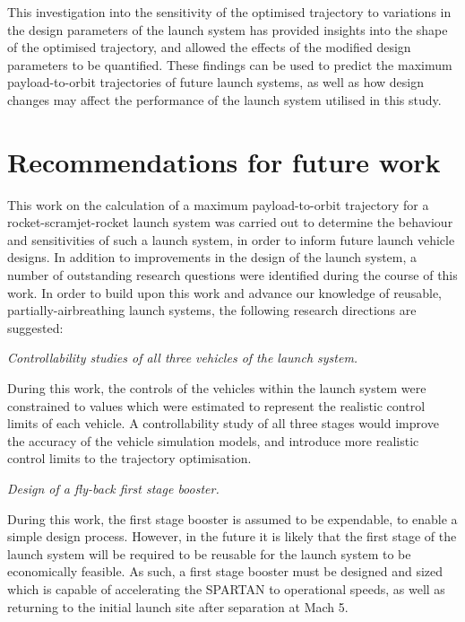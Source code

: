 This investigation into the sensitivity of the optimised trajectory to variations in the design parameters of the launch system has provided insights into the shape of the optimised trajectory, and allowed the effects of the modified design parameters to be quantified. These findings can be used to predict the maximum payload-to-orbit trajectories of future launch systems, as well as how design changes may affect the performance of the launch system utilised in this study. 

  \chapter{Recommendations for future work}
 This work on the calculation of a maximum payload-to-orbit trajectory for a rocket-scramjet-rocket launch system was carried out to determine the behaviour and sensitivities of such a launch system, in order to inform future launch vehicle designs. 
 In addition to improvements in the design of the launch system, a number of outstanding research questions were identified during the course of this work.
 In order to build upon this work and advance our knowledge of reusable, partially-airbreathing launch systems, the following research directions are suggested:

\vspace{10pt}
\textit{Controllability studies of all three vehicles of the launch system.}

 \noindent
During this work, the controls of the vehicles within the launch system were constrained to values which were estimated to represent the realistic control limits of each vehicle. 
A controllability study of all three stages would improve the accuracy of the vehicle simulation models, and introduce more realistic control limits to the trajectory optimisation. 

\vspace{10pt}
 \textit{Design of a fly-back first stage booster.}
 
 \noindent
 During this work, the first stage booster is assumed to be expendable, to enable a simple design process. However, in the future it is likely that the first stage of the launch system will be required to be reusable for the launch system to be economically feasible. As such, a first stage booster must be designed and sized which is capable of accelerating the SPARTAN to operational speeds, as well as returning to the initial launch site after separation at Mach 5. 

